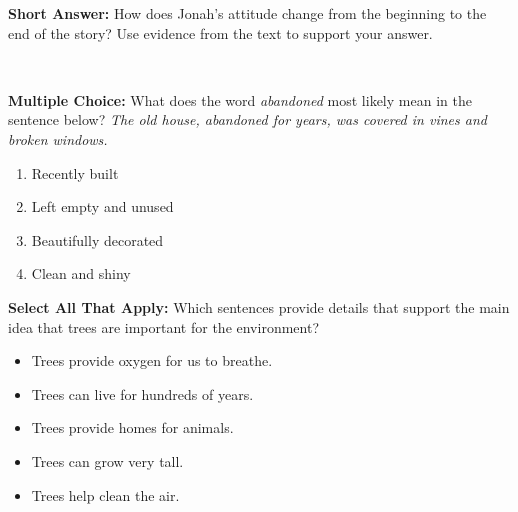 \documentclass[12pt]{article}
\begin{document}
\begin{tcolorbox}[colframe=black!50, colback=white, title=Question 3]
\textbf{Short Answer:} How does Jonah’s attitude change from the beginning to the end of the story? Use evidence from the text to support your answer.  

\vspace{2em}
\underline{\hspace{15.8cm}}  
    \\[0.8cm] \underline{\hspace{15.8cm}}  
\end{tcolorbox}

\begin{tcolorbox}[colframe=black!50, colback=white, title=Question 4]
\textbf{Multiple Choice:} What does the word \textit{abandoned} most likely mean in the sentence below?  
\textit{The old house, abandoned for years, was covered in vines and broken windows.}  
\begin{enumerate}[label=(\Alph*)]
\item Recently built  
\item Left empty and unused  
\item Beautifully decorated  
\item Clean and shiny  
\end{enumerate}
\end{tcolorbox}

\begin{tcolorbox}[colframe=black!50, colback=white, title=Question 5]
\textbf{Select All That Apply:} Which sentences provide details that support the main idea that trees are important for the environment?  
\begin{itemize}
\item Trees provide oxygen for us to breathe.  
\item Trees can live for hundreds of years.  
\item Trees provide homes for animals.  
\item Trees can grow very tall.  
\item Trees help clean the air.  
\end{itemize}
\end{tcolorbox}
\end{document}
